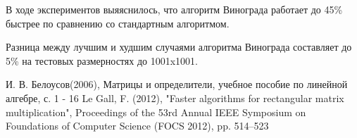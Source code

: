 \documentclass[a4paper,12pt]{report}
\begin{document}
			В ходе экспериментов выяяснилось, что алгоритм Винограда работает до 45\% быстрее по сравнению со стандартным алгоритмом. 
			
			Разница между лучшим и худшим случаями алгоритма Винограда составляет до 5\% на тестовых размерностях до 1001x1001.
       
    \begin{thebibliography}{2}
    	И. В. Белоусов(2006), Матрицы и определители, учебное пособие по линейной алгебре, с. 1 - 16
    	Le Gall, F. (2012), "Faster algorithms for rectangular matrix multiplication", Proceedings of the 53rd Annual IEEE Symposium on Foundations of Computer Science (FOCS 2012), pp. 514–523
    \end{thebibliography}
       
\end{document}
